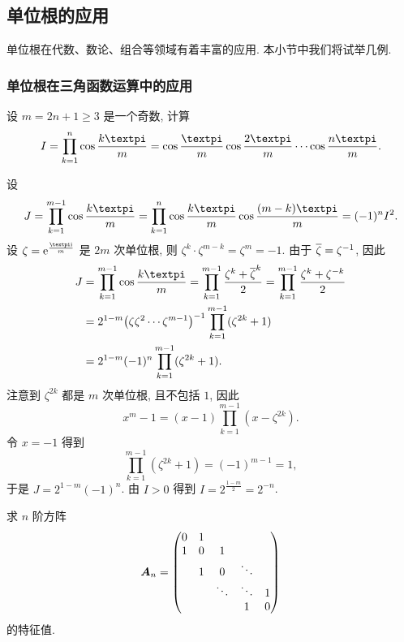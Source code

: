 \subsection{单位根的应用\optional}

单位根在代数、数论、组合等领域有着丰富的应用.
本小节中我们将试举几例.


\subsubsection{单位根在三角函数运算中的应用}

\begin{example}
  设 $m=2n+1\ge 3$ 是一个奇数, 计算
  \[
    I=\prod_{k=1}^n\cos\frac{k\cpi}m
    =\cos\frac{\cpi}m \cos\frac{2\cpi}m \cdots \cos\frac{n\cpi}m.
  \]
\end{example}

\begin{solution}
  设
  \[
     J
    =\prod_{k=1}^{m-1}\cos\frac{k\cpi}m
    =\prod_{k=1}^n\cos\frac{k\cpi}m\cos\frac{(m-k)\cpi}m
    =(-1)^n I^2.
  \]
  设 $\zeta=\ee^{\frac{\cpi\ii}m}$ 是 $2m$ 次单位根, 则 $\zeta^k\cdot\zeta^{m-k}=\zeta^m=-1$.
  由于 $\overline\zeta=\zeta^{-1}$, 因此
  \begin{align*}
     J&
    =\prod_{k=1}^{m-1}\cos\frac{k\cpi}m
    =\prod_{k=1}^{m-1}\frac{\zeta^k+{\ov\zeta}^k}2
    =\prod_{k=1}^{m-1}\frac{\zeta^k+\zeta^{-k}}2\\&
    =2^{1-m}\bigl(\zeta\zeta^2\cdots\zeta^{m-1}\bigr)^{-1}
      \prod_{k=1}^{m-1}(\zeta^{2k}+1)\\&
    =2^{1-m}(-1)^n
      \prod_{k=1}^{m-1}(\zeta^{2k}+1).
  \end{align*}
  注意到 $\zeta^{2k}$ 都是 $m$ 次单位根, 且不包括 $1$, 因此
  \[
    x^m-1=(x-1)\prod_{k=1}^{m-1}(x-\zeta^{2k}).
  \]
  令 $x=-1$ 得到
  \[
    \prod_{k=1}^{m-1}(\zeta^{2k}+1)=(-1)^{m-1}=1,
  \]
  于是 $J=2^{1-m}(-1)^n$.
  由 $I>0$ 得到 $I=2^{\frac{1-m}2}=2^{-n}$.
\end{solution}

\begin{example}
  求 $n$ 阶方阵
  \[
    {\boldsymbol{A}}_n=\begin{pmatrix}
      0&1&&&\\
      1&0&1&&\\
      &1&0&\ddots&\\
      &&\ddots&\ddots &1\\
      &&&1&0
    \end{pmatrix}
  \]
  的特征值.
\end{example}

